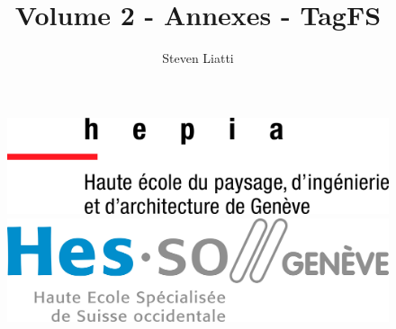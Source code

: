 \documentclass[a4paper, 12pt]{article}
\begin{document}
\title{Volume 2 - Annexes - TagFS}
\author{Steven Liatti}
\maketitle

\begin{figure}[!b]
	\centering
	\begin{minipage}{.5\textwidth}
		\centering
		\includegraphics[width=.7\linewidth]{images/hepia.jpg}
	\end{minipage}%
	\begin{minipage}{.5\textwidth}
		\centering
		\includegraphics[width=.7\linewidth]{images/hesso.jpg}
	\end{minipage}
\end{figure}
\newpage


\tableofcontents
\newpage


\appendix

\end{document}
